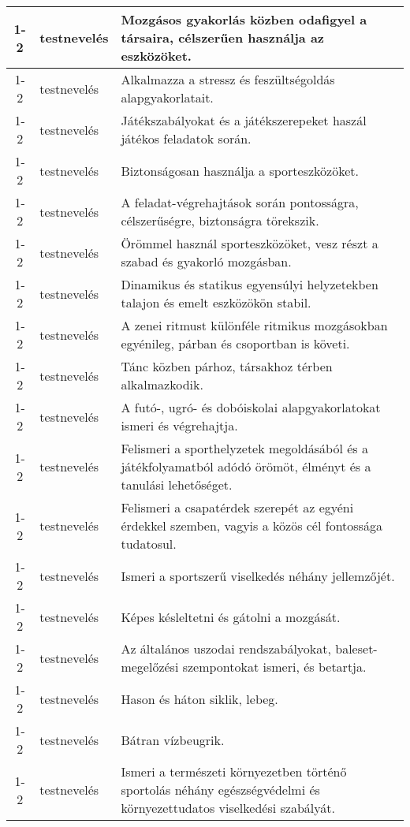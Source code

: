 \begin{small}
\begin{longtable}{c | p{2cm} |  p{11cm} }
              1-2 & testnevelés & Mozgásos gyakorlás közben odafigyel a társaira, célszerűen használja az eszközöket. \\ \hline
              1-2 & testnevelés & Alkalmazza a stressz és feszültségoldás alapgyakorlatait. \\ \hline
              1-2 & testnevelés & Játékszabályokat és a játékszerepeket haszál játékos feladatok során. \\ \hline
              1-2 & testnevelés & Biztonságosan használja a sporteszközöket. \\ \hline
              1-2 & testnevelés & A feladat-végrehajtások során pontosságra, célszerűségre, biztonságra törekszik. \\ \hline
              1-2 & testnevelés & Örömmel használ sporteszközöket, vesz részt a szabad és gyakorló mozgásban. \\ \hline
              1-2 & testnevelés & Dinamikus és statikus egyensúlyi helyzetekben talajon és emelt eszközökön stabil. \\ \hline
              1-2 & testnevelés & A zenei ritmust különféle ritmikus mozgásokban egyénileg, párban és csoportban is követi. \\ \hline
              1-2 & testnevelés & Tánc közben párhoz, társakhoz térben alkalmazkodik. \\ \hline
              1-2 & testnevelés & A futó-, ugró- és dobóiskolai alapgyakorlatokat ismeri és végrehajtja. \\ \hline
              1-2 & testnevelés & Felismeri a sporthelyzetek megoldásából és a játékfolyamatból adódó örömöt, élményt és a tanulási lehetőséget. \\ \hline
              1-2 & testnevelés & Felismeri a csapatérdek szerepét az egyéni érdekkel szemben, vagyis a közös cél fontossága tudatosul. \\ \hline
              1-2 & testnevelés & Ismeri a sportszerű viselkedés néhány jellemzőjét. \\ \hline
              1-2 & testnevelés & Képes késleltetni és gátolni a mozgását. \\ \hline
              1-2 & testnevelés & Az általános uszodai rendszabályokat, baleset-megelőzési szempontokat ismeri, és betartja. \\ \hline
              1-2 & testnevelés & Hason és háton siklik, lebeg. \\ \hline
              1-2 & testnevelés & Bátran vízbeugrik. \\ \hline
              1-2 & testnevelés & Ismeri a természeti környezetben történő sportolás néhány egészségvédelmi és környezettudatos viselkedési szabályát. \\ \hline

\end{longtable}
\end{small}
